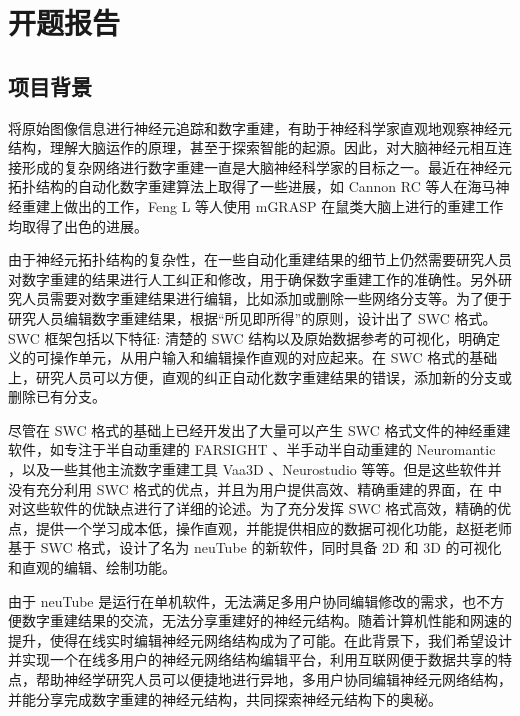 \chapter*{\zjutitlec 开题报告}

\section{项目背景}
将原始图像信息进行神经元追踪和数字重建，有助于神经科学家直观地观察神经元结构，理解大脑运作的原理，甚至于探索智能的起源。因此，对大脑神经元相互连接形成的复杂网络进行数字重建一直是大脑神经科学家的目标之一。最近在神经元拓扑结构的自动化数字重建算法上取得了一些进展，如 Cannon RC 等人在海马神经重建上做出的工作\cite{Cannon1998An}，Feng L 等人使用 mGRASP 在鼠类大脑上进行的重建工作\cite{Druckmann2014Structured}均取得了出色的进展。

由于神经元拓扑结构的复杂性，在一些自动化重建结果的细节上仍然需要研究人员对数字重建的结果进行人工纠正和修改，用于确保数字重建工作的准确性。另外研究人员需要对数字重建结果进行编辑，比如添加或删除一些网络分支等。为了便于研究人员编辑数字重建结果，根据“所见即所得”的原则，设计出了 SWC 格式\cite{Peng2011Proof}。SWC 框架包括以下特征: 清楚的 SWC 结构以及原始数据参考的可视化，明确定义的可操作单元，从用户输入和编辑操作直观的对应起来。在 SWC 格式的基础上，研究人员可以方便，直观的纠正自动化数字重建结果的错误，添加新的分支或删除已有分支。

尽管在 SWC 格式的基础上已经开发出了大量可以产生 SWC 格式文件的神经重建软件，如专注于半自动重建的 FARSIGHT \cite{Luisi2011The}、半手动半自动重建的 Neuromantic \cite{Myatt2012Neuromantic}，以及一些其他主流数字重建工具 Vaa3D \cite{Peng2010Seeing}、Neurostudio \cite{Rodriguez2006Rayburst} 等等。但是这些软件并没有充分利用 SWC 格式的优点，并且为用户提供高效、精确重建的界面，在 \cite{Feng2014neuTube} 中对这些软件的优缺点进行了详细的论述。为了充分发挥 SWC 格式高效，精确的优点，提供一个学习成本低，操作直观，并能提供相应的数据可视化功能，赵挺老师基于 SWC 格式，设计了名为 neuTube 的新软件\cite{Feng2014neuTube}，同时具备 2D 和 3D 的可视化和直观的编辑、绘制功能。

由于 neuTube 是运行在单机软件，无法满足多用户协同编辑修改的需求，也不方便数字重建结果的交流，无法分享重建好的神经元结构。随着计算机性能和网速的提升，使得在线实时编辑神经元网络结构成为了可能。在此背景下，我们希望设计并实现一个在线多用户的神经元网络结构编辑平台，利用互联网便于数据共享的特点，帮助神经学研究人员可以便捷地进行异地，多用户协同编辑神经元网络结构，并能分享完成数字重建的神经元结构，共同探索神经元结构下的奥秘。

